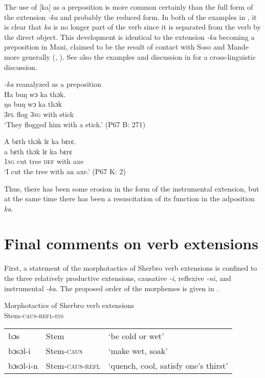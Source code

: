 The use of [ka] as a preposition is more common certainly than the full form of the extension \textit{{}-ka} and probably the reduced form. In both of the examples in , it is clear that \textit{ka} is no longer part of the verb since it is separated from the verb by the direct object. This development is identical to the extension \textit{{}-ka} becoming a preposition in Mani, claimed to be the result of contact with Soso and Mande more generally (\citealt{Childs2011}, \citealt{Childs2017}). See also the examples and discussion in  for a cross-linguistic discussion.

\ea%
  \label{ex:169}
  \textit{{}-ka} reanalyzed as a preposition\\
  
  \ea Ha buŋ wɔ ka thɔk.\\
  \gll ŋa    buŋ  wɔ    ka    thɔk\\
  \textsc{3pl}  flog  \textsc{3sg}  with  stick\\
  \glt ‘They flogged him with a stick.' (P67 B: 271)

  \ex A bɛth thɔk lɛ ka bɛrɛ.\\
  \gll a    bɛth  thɔk  lɛ    ka    bɛrɛ\\
  \textsc{1sg}  cut  tree  \textsc{def}  with  axe\\
  \glt ‘I cut the tree with an axe.' (P67 K: 2)
\z
\z

Thus, there has been some erosion in the form of the instrumental extension, but at the same time there has been a resuscitation of its function in the adposition \textit{ka}.

\section{Final comments on verb extensions}
\label{sec:6.4}\hypertarget{Toc115517803}{}
First, a statement of the morphotactics of Sherbro verb extensions is confined to the three relatively productive extensions, causative \textit{{}-i}, reflexive \textit{{}-ni}, and instrumental \textit{{}-ka}. The proposed order of the morphemes is given in .

\ea%
  \label{ex:170}
  Morphotactics of Sherbro verb extensions\\
  \ea Stem-\textsc{caus-refl-ins}\\
  \begin{tabular}{lll}
  bɔs & Stem & ‘be cold or wet'\\
  bɔsɔl-i & Stem-\textsc{caus} & ‘make wet, soak'\\
  bɔsɔl-i-n &  Stem-\textsc{caus-refl} & ‘quench, cool, satisfy one's thirst'\\
  \end{tabular}
  
